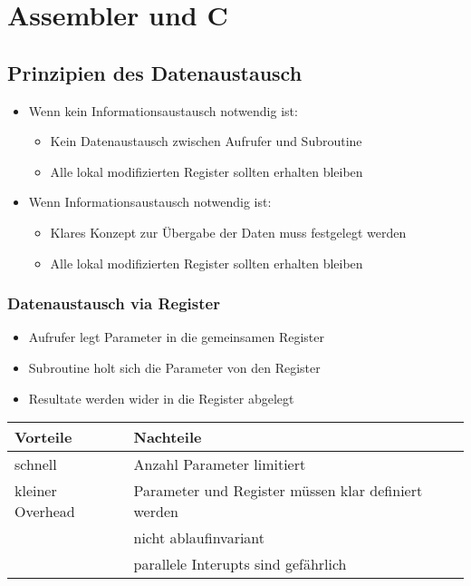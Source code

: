 \section{Assembler und C}
\subsection{Prinzipien des Datenaustausch}
\begin{itemize}
  \item Wenn kein Informationsaustausch notwendig ist:
  	\begin{itemize}
  		\item Kein Datenaustausch zwischen Aufrufer und Subroutine
  		\item Alle lokal modifizierten Register sollten erhalten bleiben
	\end{itemize}
  \item Wenn Informationsaustausch notwendig ist:
  	\begin{itemize}
  		\item Klares Konzept zur Übergabe der Daten muss festgelegt werden
  		\item Alle lokal modifizierten Register sollten erhalten bleiben
	\end{itemize}
\end{itemize}


\subsubsection{Datenaustausch via Register}
\begin{itemize}
  \item Aufrufer legt Parameter in die gemeinsamen Register
  \item Subroutine holt sich die Parameter von den Register
  \item Resultate werden wider in die Register abgelegt
\end{itemize}
\begin{tabular}{p{}|l}
	\textbf{Vorteile} 	& \textbf{Nachteile} \\
	\hline
	schnell				& Anzahl Parameter limitiert \\
	kleiner Overhead	& Parameter und Register müssen klar definiert werden \\
						& nicht ablaufinvariant \\ 
						& parallele Interupts sind gefährlich
\end{tabular}


